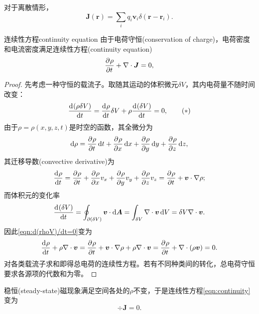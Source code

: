 \begin{corollary}
    对于离散情形，
    \begin{equation}
        \bm J(\bm r) = \sum_i q_i\bm v_i\delta(\bm r - \bm r_i).
    \end{equation}
\end{corollary}

\begin{theorem}
    {连续性方程}{continuity equation}
    由于电荷守恒(conservation of charge)，电荷密度和电流密度满足连续性方程(continuity equation)
    \begin{equation}
        \label{eqn:continuity}
        \pv\rho t + \div\bm J = 0,
    \end{equation}
\end{theorem}
\begin{proof}
    先考虑一种守恒的载流子。取随其运动的体积微元$\delta V$，其内电荷量不随时间改变：
    \begin{equation*}
        \label{eqn:d(rhoV)/dt=0}
        \dv{(\rho\delta V)}t = \dv\rho t\delta V + \rho\dv{(\delta V)}t = 0,\tag{$\ast$}
    \end{equation*}
    由于$\rho = \rho(x,y,z,t)$是时空的函数，其全微分为
    \[
        \d\rho = \pv\rho t\d t + \pv\rho x\d x + \pv\rho y\d y + \pv\rho z\d z,
    \]
    其迁移导数(convective derivative)为
    \begin{equation}
        \label{eq:ed-charge-material-derivative}
        \dv\rho t = \pv\rho t + \pv\rho xv_x + \pv\rho yv_y + \pv\rho zv_z = \pv\rho t + \bm v \cdot \grad\rho;
    \end{equation}
    而体积元的变化率
    \[
        \dv{(\delta V)}t = \oint_{\p(\delta V)}\bm v \cdot \d\bm A = \int_{\delta V}\div\bm v\d V = \delta V\div\bm v.
    \]
    因此\eqref{eqn:d(rhoV)/dt=0}变为
    \[
        \dv\rho t + \rho\div\bm v = \pv\rho t + \bm v \cdot \grad\rho + \rho\div\bm v = \pv\rho t + \div(\rho\bm v) = 0.
    \]
    对各类载流子求和即得总电荷的连续性方程。若有不同种类间的转化，总电荷守恒要求各源项的代数和为零。
\end{proof}

\begin{corollary}
    稳恒(steady-state)磁现象满足空间各处的$\rho$不变，于是连线性方程\eqref{eqn:continuity}变为
    \begin{equation}
        \div\bm J = 0.
    \end{equation}
\end{corollary}

